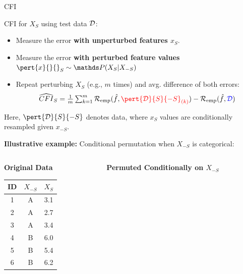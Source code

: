 \documentclass[10pt,compress,t,notes=noshow, xcolor=table]{beamer}
\begin{document}
\begin{frame}{CFI  }
\normalsize

CFI for $X_S$ using test data $\mathcal{D}$:
\begin{itemize}
  \item Measure the error \color{blue}\textbf{with unperturbed features $x_S$}\color{black}.
  \item Measure the error \textbf{\color{red}with perturbed feature values $\pert{x}{}{}_S \sim \P(X_S|X_{-S})$} 
  \item Repeat perturbing $X_S$ (e.g., $m$ times) and avg. difference of both errors: 
$$\widehat{CFI}_S = \tfrac{1}{m} \textstyle\sum\nolimits_{k = 1}^{m} \riske (\fh, {\color{red}\pert{\D}{S}{-S}_{(k)}}) - \riske (\fh, {\color{blue}\D})$$
\end{itemize}

Here, $\pert{\D}{S}{-S}$ denotes data, where $x_S$ values are conditionally resampled given $x_{-S}$.

\medskip
\textbf{Illustrative example:} Conditional permutation when $X_{-S}$ is categorical:

\begin{columns}[T, onlytextwidth]
\scriptsize
    \begin{column}{0.5\textwidth}
    \centering
    \textbf{Original Data}
    
    \begin{tabular}{ccc}
\toprule
ID & $X_{-S}$ & $X_S$ \\
\midrule
1 & \cellcolor{blue!10}A & \cellcolor{blue!10}3.1 \\
2 & \cellcolor{blue!10}A & \cellcolor{blue!10}2.7 \\
3 & \cellcolor{blue!10}A & \cellcolor{blue!10}3.4 \\
\midrule
4 & \cellcolor{red!10}B & \cellcolor{red!10}6.0 \\
5 & \cellcolor{red!10}B & \cellcolor{red!10}5.4 \\
6 & \cellcolor{red!10}B & \cellcolor{red!10}6.2 \\
\bottomrule
\end{tabular}
    \end{column}
    
    \begin{column}{0.5\textwidth}
    \centering
    \textbf{Permuted Conditionally on $X_{-S}$}


\end{column}
\end{columns}
\end{frame}
\end{document}
